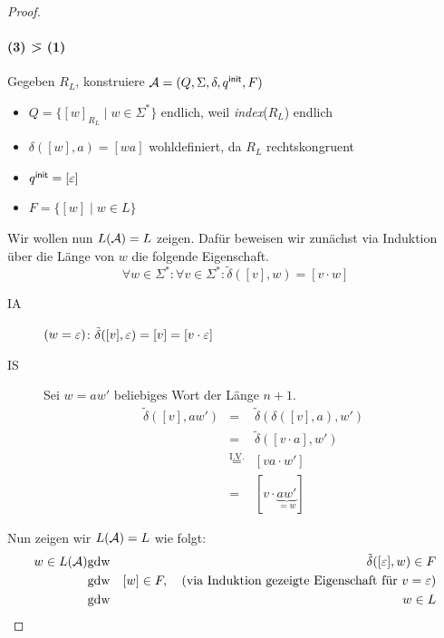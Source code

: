\begin{proof}
\paragraph{(3) \=> (1)} Gegeben $R_L$, konstruiere $\mathcal{A}=(Q,\Sigma,\delta,{q^\mathsf{init}},F)$
    \begin{itemize}
    \item $Q = \{ [w]_{R_L} \mid w\in \Sigma^* \}$ \quad endlich, weil \textit{index}($R_L$) endlich
    \item $\delta([w],a) = [wa]$ wohldefiniert, da $R_L$ rechtskongruent
    \item ${q^\mathsf{init}} = [\varepsilon]$
    \item $F = \{ [w] \mid w\in L \}$
    \end{itemize}
    Wir wollen nun $L(\mathcal{A})=L$ zeigen. Dafür beweisen wir zunächst via Induktion über die Länge von $w$ die folgende Eigenschaft.
        \begin{displaymath}
      \forall w\in\Sigma^* :
                        \forall v\in\Sigma^* : \tilde\delta([v],w) = [v\cdot w]
    \end{displaymath}
    \begin{description}
    \item[IA] $(w = \varepsilon)$: $\tilde\delta([v],\varepsilon) = [v]=[v\cdot\varepsilon]$
    \item [IS] Sei $w = aw'$ beliebiges Wort der Länge $n+1$.
      \begin{displaymath}
        \begin{array}{lcl}
        \tilde\delta([v],aw') &=& \tilde\delta(\delta([v],a),w') \\
                             &=& \tilde\delta([v\cdot a],w') \\
                             &\stackrel{\text{I.V.}}{=}&[va\cdot w'] \\
                             &=& [v\cdot \underbrace{aw'}_{=w}]
        \end{array}
      \end{displaymath}
    \end{description}

Nun zeigen wir $L(\mathcal{A})=L$ wie folgt:
\begin{eqnarray*}
        w\in L(\mathcal{A})
        & \text{gdw} & \tilde\delta([\varepsilon],w)\in F\\
        & \text{gdw} & [w]\in F, \quad \text{(via Induktion gezeigte Eigenschaft für $v=\varepsilon$)}\\
        & \text{gdw} & w\in L
\end{eqnarray*}
\end{proof}
